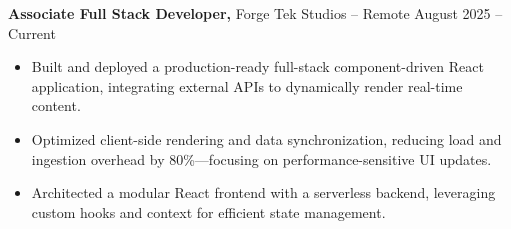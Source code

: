 \documentclass[11pt]{article}       %
\begin{document}
\textbf{Associate Full Stack Developer,} {Forge Tek Studios} -- Remote \hfill August 2025 -- Current 
\vspace{-9pt}
\begin{itemize}
  \item Built and deployed a production-ready full-stack component-driven React application, integrating external APIs to dynamically render real-time content.
  \item Optimized client-side rendering and data synchronization, reducing load and ingestion overhead by 80\%—focusing on performance-sensitive UI updates.
  \item Architected a modular React frontend with a serverless backend, leveraging custom hooks and context for efficient state management.
\end{itemize}

\end{document}
